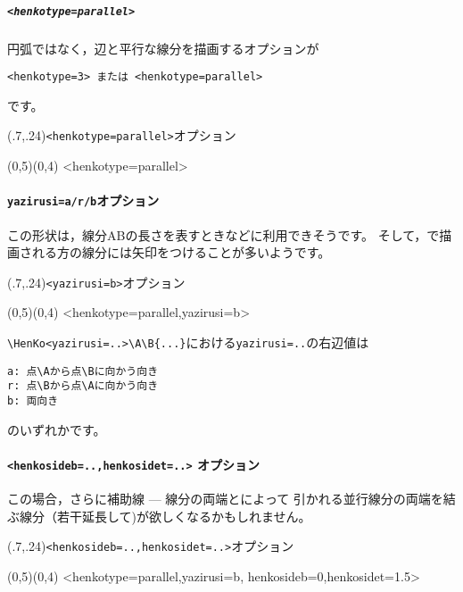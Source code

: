 \subparagraph{\texttt{<henkotype=parallel>}}
円弧ではなく，辺と平行な線分を描画するオプションが
\begin{jquote}
\begin{verbatim}
<henkotype=3> または <henkotype=parallel>
\end{verbatim}
\end{jquote}
です。

\begin{showEx}(.7,.24){\texttt{<henkotype=parallel>}オプション}
\begin{zahyou*}[ul=6mm](0,5)(0,4)
  \Hasen{\A\B}
  \HenKo<henkotype=parallel>\A{}
\end{zahyou*}
\end{showEx}

\paragraph{\texttt{yazirusi=a/r/b}オプション}

この形状は，線分ABの長さを表すときなどに利用できそうです。
そして，で描画される方の線分には矢印をつけることが多いようです。

\begin{showEx}(.7,.24){\texttt{<yazirusi=b>}オプション}
\begin{zahyou*}[ul=6mm](0,5)(0,4)
  \Hasen{\A\B}
  \HenKo<henkotype=parallel,yazirusi=b>\A{}
\end{zahyou*}
\end{showEx}

\verb+\HenKo<yazirusi=..>\A\B{...}+における\verb+yazirusi=..+の右辺値は
\begin{jquote}
\begin{verbatim}
a: 点\Aから点\Bに向かう向き
r: 点\Bから点\Aに向かう向き
b: 両向き
\end{verbatim}
\end{jquote}
のいずれかです。

\paragraph{\texttt{<henkosideb=..,henkosidet=..>} オプション}
この場合，さらに補助線 --- 線分の両端とによって
引かれる並行線分の両端を結ぶ線分（若干延長して)が欲しくなるかもしれません。

\begin{showEx}(.7,.24){\texttt{<henkosideb=..,henkosidet=..>}オプション}
\begin{zahyou*}[ul=6mm](0,5)(0,4)
  \Hasen{\A\B}
  \HenKo<henkotype=parallel,yazirusi=b,%
    henkosideb=0,henkosidet=1.5>\A{}
\end{zahyou*}
\end{showEx}

